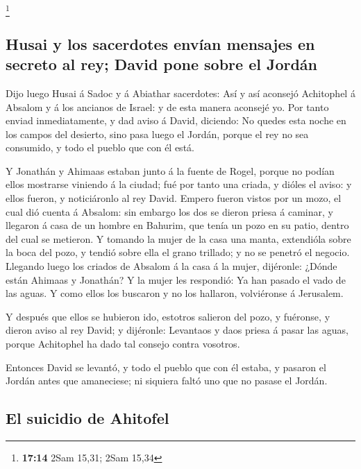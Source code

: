 \footnote{\textbf{17:14} 2Sam 15,31; 2Sam 15,34}

\hypertarget{husai-y-los-sacerdotes-envuxedan-mensajes-en-secreto-al-rey-david-pone-sobre-el-jorduxe1n}{%
\subsection{Husai y los sacerdotes envían mensajes en secreto al rey;
David pone sobre el
Jordán}\label{husai-y-los-sacerdotes-envuxedan-mensajes-en-secreto-al-rey-david-pone-sobre-el-jorduxe1n}}

 Dijo luego Husai á Sadoc y á Abiathar sacerdotes: Así y
así aconsejó Achitophel á Absalom y á los ancianos de Israel: y de esta
manera aconsejé yo.  Por tanto enviad inmediatamente, y dad
aviso á David, diciendo: No quedes esta noche en los campos del
desierto, sino pasa luego el Jordán, porque el rey no sea consumido, y
todo el pueblo que con él está.

 Y Jonathán y Ahimaas estaban junto á la fuente de Rogel,
porque no podían ellos mostrarse viniendo á la ciudad; fué por tanto una
criada, y dióles el aviso: y ellos fueron, y noticiáronlo al rey David.
 Empero fueron vistos por un mozo, el cual dió cuenta á
Absalom: sin embargo los dos se dieron priesa á caminar, y llegaron á
casa de un hombre en Bahurim, que tenía un pozo en su patio, dentro del
cual se metieron.  Y tomando la mujer de la casa una manta,
extendióla sobre la boca del pozo, y tendió sobre ella el grano
trillado; y no se penetró el negocio.  Llegando luego los
criados de Absalom á la casa á la mujer, dijéronle: ¿Dónde están Ahimaas
y Jonathán? Y la mujer les respondió: Ya han pasado el vado de las
aguas. Y como ellos los buscaron y no los hallaron, volviéronse á
Jerusalem.

 Y después que ellos se hubieron ido, estotros salieron del
pozo, y fuéronse, y dieron aviso al rey David; y dijéronle: Levantaos y
daos priesa á pasar las aguas, porque Achitophel ha dado tal consejo
contra vosotros.

 Entonces David se levantó, y todo el pueblo que con él
estaba, y pasaron el Jordán antes que amaneciese; ni siquiera faltó uno
que no pasase el Jordán.

\hypertarget{el-suicidio-de-ahitofel}{%
\subsection{El suicidio de Ahitofel}\label{el-suicidio-de-ahitofel}}

